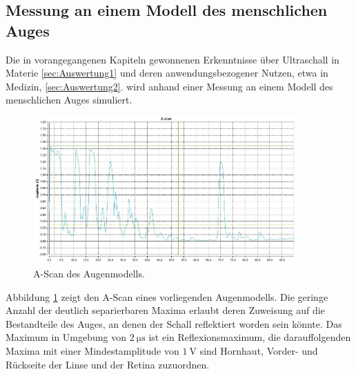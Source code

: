 \subsection{Messung an einem Modell des menschlichen Auges}
Die in vorangegangenen Kapiteln gewonnenen Erkenntnisse über Ultraschall in Materie \ref{sec:Auswertung1} und deren anwendungsbezogener Nutzen, etwa in Medizin, \ref{sec:Auswertung2}. wird anhand einer  Messung an einem Modell des menschlichen Auges simuliert.
\begin{figure}[h]
	\centering
	\includegraphics[width=0.9\textwidth]{Bilder/Auge.jpg}
	\caption{A-Scan des Augenmodells.}
	\label{fig:eye_scan}
\end{figure}
Abbildung \ref{fig:eye_scan} zeigt den A-Scan eines vorliegenden Augenmodells.
Die geringe Anzahl der deutlich separierbaren Maxima erlaubt deren Zuweisung auf die Bestandteile des Auges, an denen der Schall reflektiert worden sein könnte. 
Das Maximum in Umgebung von $\SI{2}{\micro\second}$ ist ein Reflexionsmaximum, die darauffolgenden Maxima mit einer Mindestamplitude von $\SI{1}{\volt}$ sind Hornhaut, Vorder- und Rückseite der Linse und der Retina zuzuordnen.

